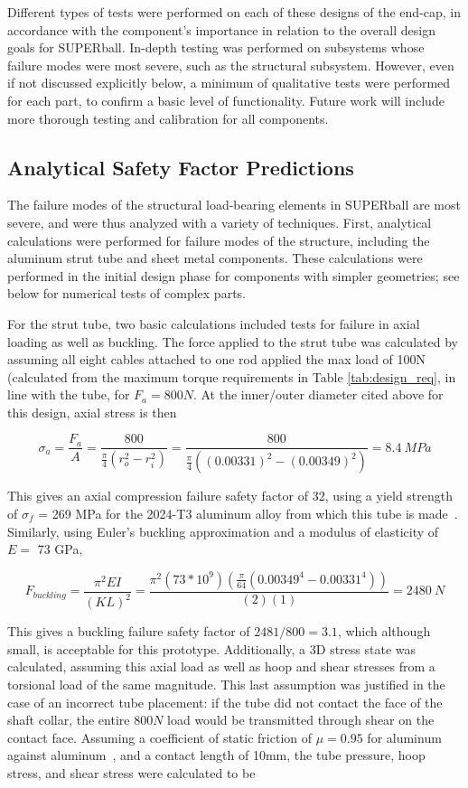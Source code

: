 \documentclass[12pt]{report}
\begin{document}
Different types of tests were performed on each of these designs of the end-cap, in accordance with the component's importance in relation to the overall design goals for SUPERball.
In-depth testing was performed on subsystems whose failure modes were most severe, such as the structural subsystem.
However, even if not discussed explicitly below, a minimum of qualitative tests were performed for each part, to confirm a basic level of functionality.
Future work will include more thorough testing and calibration for all components.

\subsection{Analytical Safety Factor Predictions}

The failure modes of the structural load-bearing elements in SUPERball are most severe, and were thus analyzed with a variety of techniques.
First, analytical calculations were performed for failure modes of the structure, including the aluminum strut tube and sheet metal components.
These calculations were performed in the initial design phase for components with simpler geometries; see below for numerical tests of complex parts.

For the strut tube, two basic calculations included tests for failure in axial loading as well as buckling.
The force applied to the strut tube was calculated by assuming all eight cables attached to one rod applied the max load of 100N (calculated from the maximum torque requirements in Table \ref{tab:design_req}, in line with the tube, for $F_a = 800N$.
At the inner/outer diameter cited above for this design, axial stress is then

\[
\sigma_a = \frac{F_a}{A} = \frac{800}{ \frac{\pi}{4} (r_o^2 - r_i^2) } = \frac{800}{ \frac{\pi}{4} ((0.00331)^2 - (0.00349)^2)} = 8.4 \ MPa
\]

This gives an axial compression failure safety factor of 32, using a yield strength of $\sigma_f$ = 269 MPa for the 2024-T3 aluminum alloy from which this tube is made~\cite{Aluminum2024_2014}. 
Similarly, using Euler's buckling approximation and a modulus of elasticity of $E =$ 73 GPa,

\[
F_{buckling} = \frac{\pi^2 E I}{(K L)^2} = \frac{\pi^2 (73 * 10^9) (\frac{\pi}{64} (0.00349^4 - 0.00331^4) )}{ (2) (1)} = 2480 \ N
\]

This gives a buckling failure safety factor of $2481 / 800 = 3.1$, which although small, is acceptable for this prototype.
Additionally, a 3D stress state was calculated, assuming this axial load as well as hoop and shear stresses from a torsional load of the same magnitude.
This last assumption was justified in the case of an incorrect tube placement: if the tube did not contact the face of the shaft collar, the entire $800N$ load would be transmitted through shear on the contact face.
Assuming a coefficient of static friction of $\mu = 0.95$ for aluminum against aluminum~\cite{AluminumFriction_2014}, and a contact length of 10mm, the tube pressure, hoop stress, and shear stress were calculated to be
\end{document}
